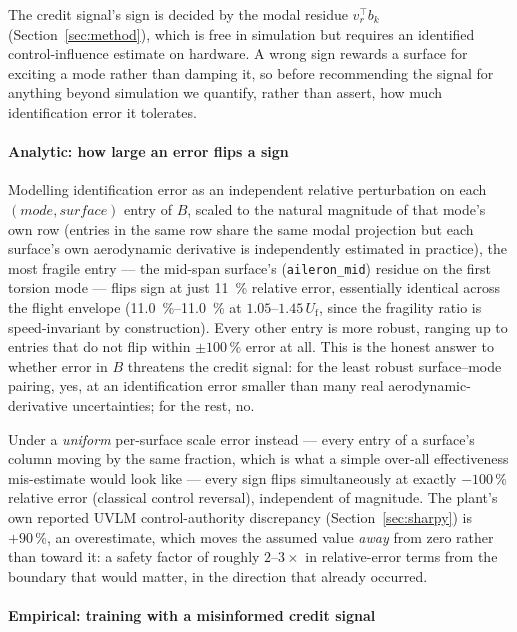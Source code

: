 \documentclass[preprint,11pt,authoryear]{elsarticle}
\newcommand{\Uf}{U_{\mathrm{f}}}
\begin{document}
The credit signal's sign is decided by the modal residue $v_r^{\top} b_k$
(Section~\ref{sec:method}), which is free in simulation but requires an
identified control-influence estimate on hardware. A wrong sign rewards a
surface for exciting a mode rather than damping it, so before recommending the
signal for anything beyond simulation we quantify, rather than assert, how
much identification error it tolerates.

\paragraph{Analytic: how large an error flips a sign}
Modelling identification error as an independent relative perturbation on each
$(mode, surface)$ entry of $B$, scaled to the natural magnitude of that mode's
own row (entries in the same row share the same modal projection but each
surface's own aerodynamic derivative is independently estimated in practice),
the most fragile entry --- the mid-span surface's (\texttt{aileron\_mid})
residue on the first torsion mode --- flips sign at just \SI{11}{\percent}
relative error, essentially
identical across the flight envelope (\SIrange{11.0}{11.0}{\percent} at
$1.05$--$1.45\,\Uf$, since the fragility ratio is speed-invariant by
construction). Every other entry is more robust, ranging up to entries that do
not flip within $\pm100\,\%$ error at all. This is the honest answer to
whether error in $B$ threatens the credit signal: for the least robust
surface--mode pairing, yes, at an identification error smaller than many
real aerodynamic-derivative uncertainties; for the rest, no.

Under a \emph{uniform} per-surface scale error instead --- every entry of a
surface's column moving by the same fraction, which is what a simple
over-all effectiveness mis-estimate would look like --- every sign flips
simultaneously at exactly $-100\,\%$ relative error (classical control
reversal), independent of magnitude. The plant's own reported UVLM
control-authority discrepancy (Section~\ref{sec:sharpy}) is $+90\,\%$, an
overestimate, which moves the assumed value \emph{away} from zero rather than
toward it: a safety factor of roughly $2$--$3\times$ in relative-error terms
from the boundary that would matter, in the direction that already occurred.

\paragraph{Empirical: training with a misinformed credit signal}

\end{document}
